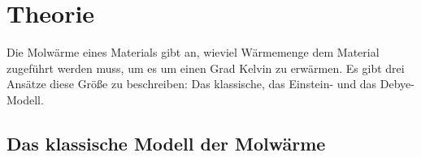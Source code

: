 \section{Theorie}
\label{sec:Theorie}



Die Molwärme eines Materials gibt an, wieviel Wärmemenge dem Material zugeführt werden muss, um es um einen Grad Kelvin zu erwärmen.
Es gibt drei Ansätze diese Größe zu beschreiben: Das klassische, das Einstein- und das Debye-Modell.

\subsection{Das klassische Modell der Molwärme}

